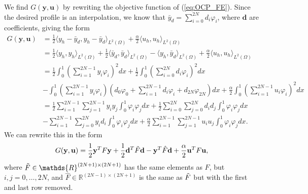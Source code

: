 We find $G(\mathbf{y, u})$ by rewriting the objective function of (\ref{eq:OCP_FE}).
Since the desired profile is an interpolation, we know that $\bar{y}_d = \sum_{i=0}^{2N}d_i\varphi_i$, where $\mathbf{d}$ are coefficients, giving the form
\begin{align*}
    G(\mathbf{y, u}) &= \frac{1}{2}\langle y_h - \bar{y}_d, y_h - \bar{y}_d \rangle_{L^2{(\Omega)}} + \frac{\alpha}{2} \langle u_h, u_h \rangle_{L^2(\Omega)} \\
   &= \frac{1}{2}\langle y_h , y_h \rangle_{L^2{(\Omega)}} +  \frac{1}{2}\langle \bar{y}_d ,\bar{y}_d  \rangle_{L^2{(\Omega)}}
   - \langle y_h, \bar{y}_d \rangle_{L^2{(\Omega)}} + \frac{\alpha}{2} \langle u_h, u_h \rangle_{L^2(\Omega)} \\
     &= \frac{1}{2}\int_0^1\left( \sum_{i=1}^{2N-1}y_i \varphi_i \right)^2dx  + \frac{1}{2}\int_0^1\left( \sum_{i=0}^{2N}d_i \varphi_i \right)^2dx \\
     &- \int_0^1\left( \sum_{i=1}^{2N-1}y_i \varphi_i \right) \left(d_0 \varphi_0 + \sum_{i=1}^{2N-1} d_i \varphi_i + d_{2N} \varphi_{2N} \right)dx + 
     \frac{\alpha}{2}\int_0^1\left(\sum_{i=1}^{2N-1} u_i \varphi_i  \right)^2dx \\    
     &= \frac{1}{2}\sum_{i=1}^{2N-1}\sum_{j=1}^{2N-1} y_i y_j \int_0^1 \varphi_i \varphi_j dx + \frac{1}{2}\sum_{i=0}^{2N}\sum_{j=0}^{2N} d_i d_j \int_0^1 \varphi_i \varphi_j dx \\
    &- \sum_{i=1}^{2N-1} \sum_{j=0}^{2N} y_i d_i \int_0^1 \varphi_i \varphi_j dx +  \frac{\alpha}{2}\sum_{i=1}^{2N-1}\sum_{j=1}^{2N-1} u_i u_j \int_0^1\varphi_i \varphi_j dx.
\end{align*}
We can rewrite this in the form
$$
G(\mathbf{y, u}) = \frac{1}{2}\mathbf{y}^T F \mathbf{y} + \frac{1}{2}\mathbf{d}^T\Tilde{F} \mathbf{d} - \mathbf{y}^T\hat{F}\mathbf{d} + \frac{\alpha}{2}\mathbf{u}^T F \mathbf{u},
$$
where $\Tilde{F} \in \mathds{R}^{(2N+1) \times (2N+1)}$ has the same elements as $F$, but $i, j = 0, \dots, 2N$, 
and $\hat{F} \in \mathds{R}^{(2N-1) \times (2N+1)}$ is the same as $\Tilde{F}$ but with the first and last row removed.  



